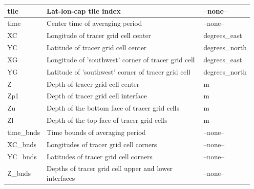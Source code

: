 \begin{longtable}{|m{}|m{}|m{}|}
tile &Lat-lon-cap tile index &--none--  \\ \hline
time &Center time of averaging period &--none--  \\ \hline
XC &Longitude of tracer grid cell center &degrees\_east  \\ \hline
YC &Latitude of tracer grid cell center &degrees\_north  \\ \hline
XG &Longitude of 'southwest' corner of tracer grid cell &degrees\_east  \\ \hline
YG &Latitude of 'southwest' corner of tracer grid cell &degrees\_north  \\ \hline
Z &Depth of tracer grid cell center &m  \\ \hline
Zp1 &Depth of tracer grid cell interface &m  \\ \hline
Zu &Depth of the bottom face of tracer grid cells &m  \\ \hline
Zl &Depth of the top face of tracer grid cells &m  \\ \hline
time\_bnds &Time bounds of averaging period &--none--  \\ \hline
XC\_bnds &Longitudes of tracer grid cell corners &--none--  \\ \hline
YC\_bnds &Latitudes of tracer grid cell corners &--none--  \\ \hline
Z\_bnds &Depths of tracer grid cell upper and lower interfaces &--none--  \\ \hline
\end{longtable}

\newp
\pagebreak
